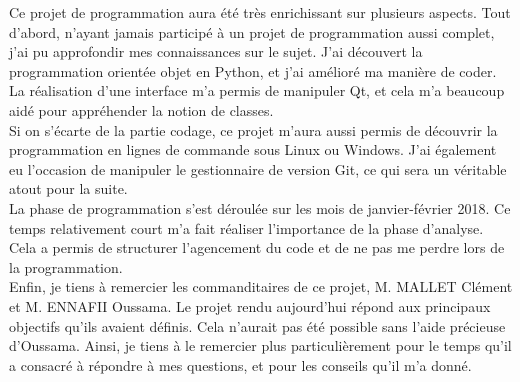 \documentclass{themeensg}
\begin{document}
Ce projet de programmation aura été très enrichissant sur plusieurs aspects. Tout d'abord, n'ayant jamais participé à un projet de programmation aussi complet, j'ai pu approfondir mes connaissances sur le sujet. J'ai découvert la programmation orientée objet en Python, et j'ai amélioré ma manière de coder. La réalisation d'une interface m'a permis de manipuler Qt, et cela m'a beaucoup aidé pour appréhender la notion de classes. \\

Si on s'écarte de la partie codage, ce projet m'aura aussi permis de découvrir la programmation en lignes de commande sous Linux ou Windows. J'ai également eu l'occasion de manipuler le gestionnaire de version Git, ce qui sera un véritable atout pour la suite.\\

La phase de programmation s'est déroulée sur les mois de janvier-février 2018. Ce temps relativement court m'a fait réaliser l'importance de la phase d'analyse. Cela a permis de structurer l'agencement du code et de ne pas me perdre lors de la programmation.\\

Enfin, je tiens à remercier les commanditaires de ce projet, M. MALLET Clément et M. ENNAFII Oussama. Le projet rendu aujourd'hui répond aux principaux objectifs qu'ils avaient définis. Cela n'aurait pas été possible sans l'aide précieuse d'Oussama. Ainsi, je tiens à le remercier plus particulièrement pour le temps qu'il a consacré à répondre à mes questions, et pour les conseils qu'il m'a donné.\\

\newpage
\listoffigures

\end{document}
